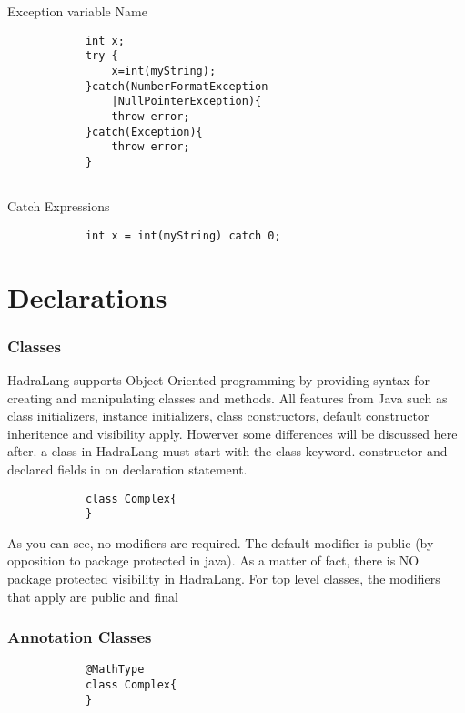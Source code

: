 \documentclass{tufte-book}
\begin{document}
            Exception variable Name
            \begin{lstlisting}
            int x;
            try {
                x=int(myString);
            }catch(NumberFormatException
                |NullPointerException){
                throw error;
            }catch(Exception){
                throw error;
            }
            
            \end{lstlisting}
            Catch Expressions
            \begin{lstlisting}
            int x = int(myString) catch 0;
            \end{lstlisting}
            
            \chapter{Declarations}
            \subsection{Classes}
            HadraLang supports Object Oriented programming by providing syntax for creating and manipulating classes and methods. All features from Java such as class initializers, instance initializers, class constructors, default constructor inheritence and visibility apply. Howerver some differences will be discussed here after.
            a class in HadraLang must start with the class keyword.
            constructor and  declared fields in on declaration statement.

            \begin{lstlisting}
            class Complex{
            }
            \end{lstlisting}


            As you can see, no modifiers are required. The default modifier is \textcolor{keyword1}{public}  (by opposition to package protected in java). As a matter of fact, there is NO package protected visibility in HadraLang. For top level classes, the modifiers that apply are public and final


            \subsection{Annotation Classes}
            \begin{lstlisting}
            @MathType
            class Complex{
            }
            \end{lstlisting}
\end{document}

